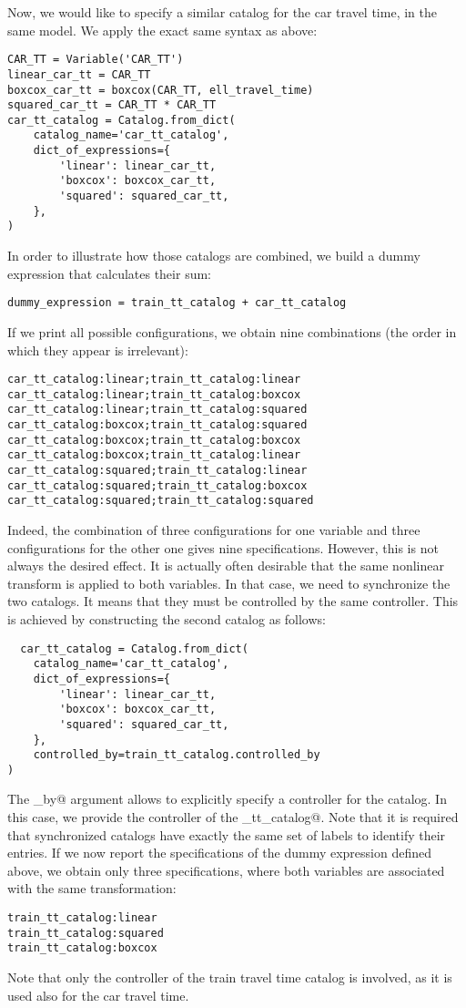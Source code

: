 \documentclass[12pt,a4paper]{article}
\begin{document}
Now, we would like to specify a similar catalog for the car travel time, in the same model. We apply the exact same syntax as above:
\begin{lstlisting}
CAR_TT = Variable('CAR_TT')
linear_car_tt = CAR_TT
boxcox_car_tt = boxcox(CAR_TT, ell_travel_time)
squared_car_tt = CAR_TT * CAR_TT
car_tt_catalog = Catalog.from_dict(
    catalog_name='car_tt_catalog',
    dict_of_expressions={
        'linear': linear_car_tt,
        'boxcox': boxcox_car_tt,
        'squared': squared_car_tt,
    },
)
\end{lstlisting}
In order to illustrate how those catalogs are combined, we build a dummy expression that calculates their sum:
\begin{lstlisting}
dummy_expression = train_tt_catalog + car_tt_catalog  
\end{lstlisting}
If we print all possible configurations, we obtain nine combinations (the order in which they appear is irrelevant):
\begin{lstlisting}
car_tt_catalog:linear;train_tt_catalog:linear
car_tt_catalog:linear;train_tt_catalog:boxcox
car_tt_catalog:linear;train_tt_catalog:squared
car_tt_catalog:boxcox;train_tt_catalog:squared
car_tt_catalog:boxcox;train_tt_catalog:boxcox
car_tt_catalog:boxcox;train_tt_catalog:linear
car_tt_catalog:squared;train_tt_catalog:linear
car_tt_catalog:squared;train_tt_catalog:boxcox
car_tt_catalog:squared;train_tt_catalog:squared
\end{lstlisting}

Indeed, the combination of three configurations for one variable and
three configurations for the other one gives nine
specifications. However, this is not always the desired effect. It is
actually often desirable that the same nonlinear transform is applied
to both variables. In that case, we need to synchronize the two
catalogs. It means that they must be controlled by the same
controller. This is achieved by constructing the second catalog as
follows:
\begin{lstlisting}
  car_tt_catalog = Catalog.from_dict(
    catalog_name='car_tt_catalog',
    dict_of_expressions={
        'linear': linear_car_tt,
        'boxcox': boxcox_car_tt,
        'squared': squared_car_tt,
    },
    controlled_by=train_tt_catalog.controlled_by
)
\end{lstlisting}
The \lstinline@controlled_by@ argument allows to explicitly specify a
controller for the catalog. In this case, we provide the controller of
the \lstinline@train_tt_catalog@. Note that it is required that
synchronized catalogs have exactly the same set of labels to identify
their entries. If we now report the specifications  of the dummy expression defined
above, we obtain only three specifications, where both variables are
associated with the same transformation:
\begin{lstlisting}
train_tt_catalog:linear
train_tt_catalog:squared
train_tt_catalog:boxcox
\end{lstlisting}
Note that only the controller of the train travel time catalog is involved, as it is used also for the car travel time.
\end{document}
